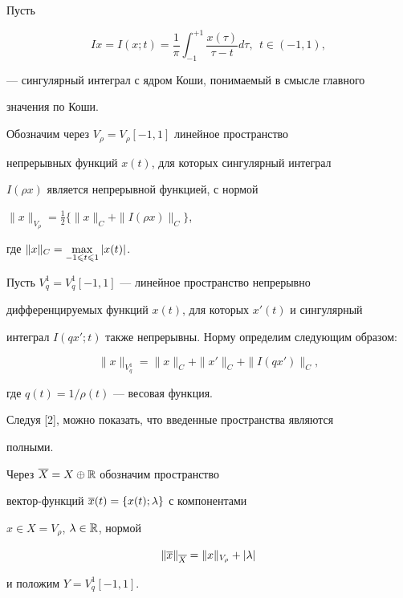 Пусть


$$


Ix = I(x;t) =


\frac{1}{\pi}\int_{-1}^{+1}\frac{x(\tau)}{\tau-t}d\tau,\ \  t\in (-1,1),


$$


--- сингулярный интеграл с ядром Коши, понимаемый в смысле главного 


значения по Коши.


Обозначим через $V_\rho = V_\rho[-1,1]$ линейное пространство


непрерывных функций $x(t)$, для которых сингулярный интеграл


$I(\rho x)$ является непрерывной функцией, с нормой


$\|x\|_{V_{\rho}} = \frac{1}{2}\{\|x\|_C + \|I(\rho x)\|_C\}$,


где $\|x\|_C = \max\limits_{-1\leqslant t\leqslant 1}|x(t)|$.


Пусть $V_q^1 = V_q^1[-1,1]$ --- линейное пространство непрерывно


дифференцируемых функций $x(t)$, для которых $x'(t)$ и сингулярный


интеграл $I(qx';t)$ также непрерывны. Норму определим следующим образом:


\begin{equation}


\|x\|_{V_q^1} = \|x\|_C + \|x'\|_C + \|I(qx')\|_C,


\end{equation}


где $q(t)=1/\rho(t)$ --- весовая функция.





Следуя [2], можно показать, что введенные пространства являются


полными.





Через $\overline{X} = X \oplus \Bbb{R}$ обозначим пространство


вектор-функций $\overline{x}(t) = \{x(t);\lambda\}$ с компонентами


$x\in X = V_\rho$, $\lambda\in \Bbb{R}$, нормой


\begin{equation}


\|\ol{x}\|_{\ol{X}} = \|x\|_{V_\rho} + |\lambda|


\end{equation}


и положим $Y = V_q^1[-1,1]$.





